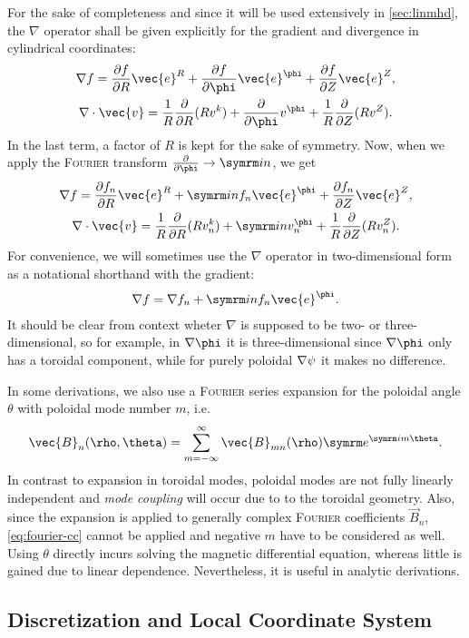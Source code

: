 For the sake of completeness and since it will be used extensively in \cref{sec:linmhd}, the $\nabla$ operator shall be given explicitly for the gradient and divergence in cylindrical coordinates:
\begin{gather}
  \grad f = \pd[f]{R} \vec{e}^{R} + \pd[f]{\phi} \vec{e}^{\phi} + \pd[f]{Z} \vec{e}^{Z}, \\
  \divg \vec{v} = \frac{1}{R} \pd{R} (R v^{k}) + \pd{\phi} v^{\phi} + \frac{1}{R} \pd{Z} (R v^{Z}).
\end{gather}
In the last term, a factor of $R$ is kept for the sake of symmetry. Now, when we apply the \textsc{Fourier} transform $\pd{\phi} \to \im n$, we get
\begin{gather}
  \grad f = \pd[f_{n}]{R} \vec{e}^{R} + \im n f_{n} \vec{e}^{\phi} + \pd[f_{n}]{Z} \vec{e}^{Z}, \\
  \divg \vec{v} = \frac{1}{R} \pd{R} (R v_{n}^{k}) + \im n v_{n}^{\phi} + \frac{1}{R} \pd{Z} (R v_{n}^{Z}).
\end{gather}
For convenience, we will sometimes use the $\nabla$ operator in two-dimensional form as a notational shorthand with the gradient:
\begin{gather}
  \grad f = \grad f_{n} + \im n f_{n} \vec{e}^{\phi}.
\end{gather}
It should be clear from context wheter $\nabla$ is supposed to be two- or three-dimensional, so for example, in $\grad \phi$ it is three-dimensional since $\grad \phi$ only has a toroidal component, while for purely poloidal $\nabla \psi$ it makes no difference.

In some derivations, we also use a \textsc{Fourier} series expansion for the poloidal angle $\theta$ with poloidal mode number $m$, i.e.
\begin{gather}
  \vec{B}_{n} (\rho, \theta) = \sum_{m = -\infty}^{\infty} \vec{B}_{m n} (\rho) \e^{\im m \theta}.
\end{gather}
In contrast to expansion in toroidal modes, poloidal modes are not fully linearly independent and \emph{mode coupling} will occur due to to the toroidal geometry. Also, since the expansion is applied to generally complex \textsc{Fourier} coefficients $\vec{B}_{n}$, \cref{eq:fourier-cc} cannot be applied and negative $m$ have to be considered as well. Using $\theta$ directly incurs solving the magnetic differential equation, whereas little is gained due to linear dependence. Nevertheless, it is useful in analytic derivations.

\subsection{Discretization and Local Coordinate System}
\label{sec:grid}

